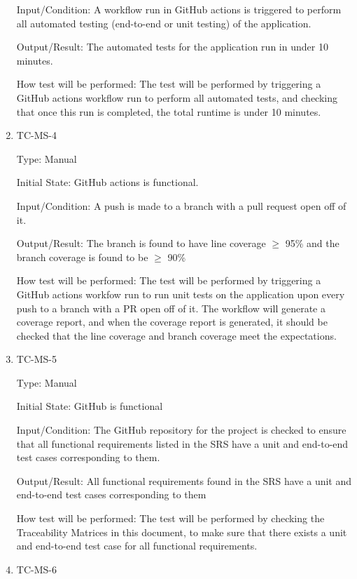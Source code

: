 \documentclass[12pt, titlepage]{article}
\begin{document}
\begin{enumerate}
    Input/Condition: A workflow run in GitHub actions is triggered to
    perform all automated testing (end-to-end or unit testing) of the
    application.

    Output/Result: The automated tests for the application run in
    under 10 minutes.

    How test will be performed: The test will be performed by
    triggering a GitHub actions workflow run to perform all automated
    tests, and checking that once this run is completed, the total
    runtime is under 10 minutes.

  \item{TC-MS-4\\}

    Type: Manual

    Initial State: GitHub actions is functional.

    Input/Condition: A push is made to a branch with a pull request
    open off of it.

    Output/Result: The branch is found to have line coverage $\ge$ 95\% and
    the branch coverage is found to be $\ge$ 90\%

    How test will be performed: The test will be performed by
    triggering a GitHub actions workfow run to run unit tests on the
    application upon every push to a branch with a PR open off of it.
    The workflow will generate a coverage report, and when the
    coverage report is generated, it should be checked that the line
    coverage and branch coverage meet the expectations.

  \item{TC-MS-5\\}

    Type: Manual

    Initial State: GitHub is functional

    Input/Condition: The GitHub repository for the project is checked
    to ensure that all functional requirements listed in the SRS have
    a unit and end-to-end test cases corresponding to them.

    Output/Result: All functional requirements found in the SRS have a unit
    and end-to-end test cases corresponding to them

    How test will be performed: The test will be performed by
    checking the Traceability Matrices in this document, to make sure
    that there exists a unit and end-to-end test case for all
    functional requirements.

  \item{TC-MS-6\\}


\end{enumerate}
\end{document}
